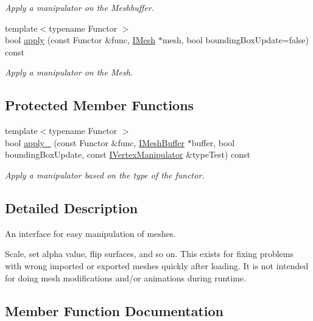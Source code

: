 \begin{DoxyCompactItemize}
\begin{DoxyCompactList}\small\item\em Apply a manipulator on the Meshbuffer. \end{DoxyCompactList}\item 
{\footnotesize template$<$typename Functor $>$ }\\bool \hyperlink{classirr_1_1scene_1_1IMeshManipulator_a5a69b634835f4314d93a192758f910da}{apply} (const Functor \&func, \hyperlink{classirr_1_1scene_1_1IMesh}{I\+Mesh} $\ast$mesh, bool bounding\+Box\+Update=false) const
\begin{DoxyCompactList}\small\item\em Apply a manipulator on the Mesh. \end{DoxyCompactList}\end{DoxyCompactItemize}
\subsection*{Protected Member Functions}
\begin{DoxyCompactItemize}
\item 
{\footnotesize template$<$typename Functor $>$ }\\bool \hyperlink{classirr_1_1scene_1_1IMeshManipulator_a774eccf79c86497b49b4dea7ead1eeb2}{apply\+\_\+} (const Functor \&func, \hyperlink{classirr_1_1scene_1_1IMeshBuffer}{I\+Mesh\+Buffer} $\ast$buffer, bool bounding\+Box\+Update, const \hyperlink{structirr_1_1scene_1_1IVertexManipulator}{I\+Vertex\+Manipulator} \&type\+Test) const
\begin{DoxyCompactList}\small\item\em Apply a manipulator based on the type of the functor. \end{DoxyCompactList}\end{DoxyCompactItemize}


\subsection{Detailed Description}
An interface for easy manipulation of meshes. 

Scale, set alpha value, flip surfaces, and so on. This exists for fixing problems with wrong imported or exported meshes quickly after loading. It is not intended for doing mesh modifications and/or animations during runtime. 

\subsection{Member Function Documentation}
\mbox{\label{classirr_1_1scene_1_1IMeshManipulator_a6d685fb465a8b5efecd0825b74099ceb}} 
